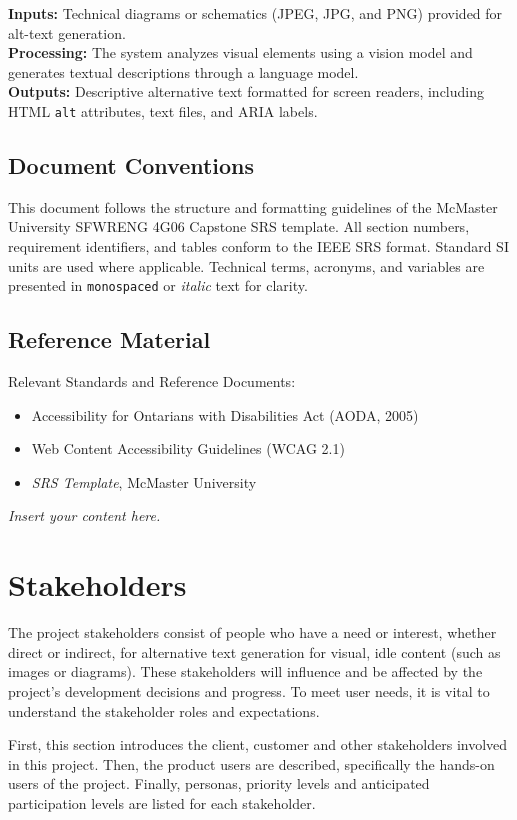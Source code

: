 \documentclass[12pt]{article}
\newcommand{\lips}{\textit{Insert your content here.}}
\begin{document}
\textbf{Inputs:} Technical diagrams or schematics (JPEG, JPG, and
PNG) provided for alt-text generation. \\[2mm]
\textbf{Processing:} The system analyzes visual elements using a
vision model and generates textual descriptions through a language
model. \\[2mm]
\textbf{Outputs:} Descriptive alternative text formatted for screen
readers, including HTML \texttt{alt} attributes, text files, and ARIA labels.

\subsection{Document Conventions}

This document follows the structure and formatting guidelines of the
McMaster University SFWRENG 4G06 Capstone SRS template.
All section numbers, requirement identifiers, and tables conform to
the IEEE SRS format.
Standard SI units are used where applicable.
Technical terms, acronyms, and variables are presented in
\texttt{monospaced} or \textit{italic} text for clarity.

\subsection{Reference Material}
Relevant Standards and Reference Documents:
\begin{itemize}
  \item Accessibility for Ontarians with Disabilities Act (AODA, 2005)
  \item Web Content Accessibility Guidelines (WCAG 2.1)
  \item \textit{SRS Template}, McMaster University
\end{itemize}

\lips
\section{Stakeholders}
The project stakeholders consist of people who have a need or
interest, whether direct or indirect, for alternative text generation
for visual, idle
content (such as images or diagrams). These stakeholders will
influence and be affected by the
project's development decisions and progress. To meet user
needs, it is vital to understand the stakeholder roles and expectations.
\par First, this section introduces the client, customer and other
stakeholders involved in this project. Then, the product users are
described, specifically the hands-on users of the project. Finally,
personas, priority levels and anticipated
participation levels are listed for each stakeholder.
\end{document}
